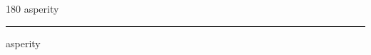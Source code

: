 
\begin{frame}
\begin{center}
\begin{turn}{180}
{\fontsize{2.5cm}{1em}\selectfont asperity}
\end{turn}
\vspace{1em}\par  
\hrule
\vspace{1em}\par  
{\fontsize{2.5cm}{1em}\selectfont asperity}
\end{center}
\end{frame}
